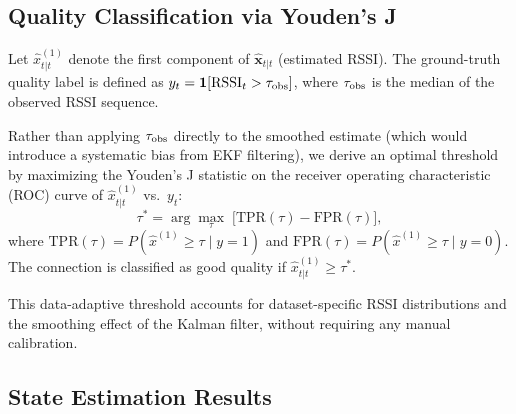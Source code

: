 \documentclass[12pt,a4paper]{article}
\begin{document}
\subsection{Quality Classification via Youden's J}

Let $\hat{x}^{(1)}_{t|t}$ denote the first component of $\hat{\mathbf{x}}_{t|t}$
(estimated RSSI). The ground-truth quality label is defined as
$y_t = \mathbf{1}[{\rm RSSI}_t > \tau_{\rm obs}]$, where $\tau_{\rm obs}$
is the median of the observed RSSI sequence.

Rather than applying $\tau_{\rm obs}$ directly to the smoothed estimate
(which would introduce a systematic bias from EKF filtering), we derive
an optimal threshold by maximizing the Youden's J statistic on the
receiver operating characteristic (ROC) curve of
$\hat{x}^{(1)}_{t|t}$ vs.\ $y_t$:
\begin{equation}
\tau^* = \arg\max_{\tau}\;\bigl[\mathrm{TPR}(\tau) - \mathrm{FPR}(\tau)\bigr],
\label{eq:youden}
\end{equation}
where $\mathrm{TPR}(\tau) = P(\hat{x}^{(1)} \geq \tau \mid y=1)$ and
$\mathrm{FPR}(\tau) = P(\hat{x}^{(1)} \geq \tau \mid y=0)$. The
connection is classified as good quality if
$\hat{x}^{(1)}_{t|t} \geq \tau^*$.

This data-adaptive threshold accounts for dataset-specific RSSI
distributions and the smoothing effect of the Kalman filter, without
requiring any manual calibration.

\subsection{State Estimation Results}
\end{document}
